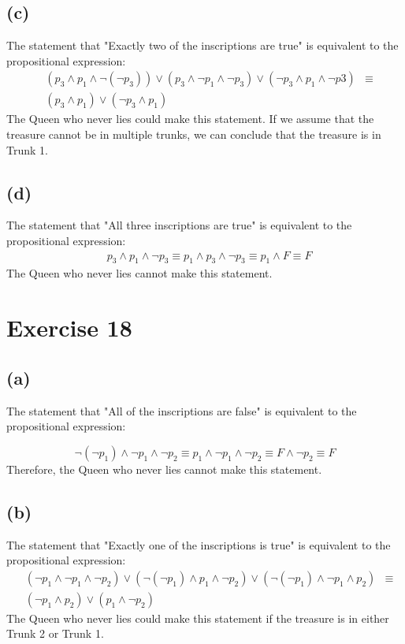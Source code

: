 \documentclass{article}
\begin{document}
\subsection{(c)}
The statement that "Exactly two of the inscriptions are true" is equivalent to the propositional expression:
\begin{align*}
	 & (p_3 \land p_1 \land \neg (\neg p_3)) \lor (p_3 \land \neg p_1 \land \neg p_3) \lor (\neg p_3 \land p_1 \land \neg p3) & \equiv \\
	 & (p_3 \land p_1) \lor (\neg p_3 \land p_1)
\end{align*}
The Queen who never lies could make this statement. If we assume that the treasure cannot be in multiple trunks, we can conclude that the treasure is in Trunk 1.

\subsection{(d)}
The statement that "All three inscriptions are true" is equivalent to the propositional expression:
\begin{align*}
	 & p_3 \land p_1 \land \neg p_3 \equiv p_1 \land p_3 \land \neg p_3 \equiv p_1 \land F \equiv F
\end{align*}
The Queen who never lies cannot make this statement.

\pagebreak

\section{Exercise 18}
\subsection{(a)}
The statement that "All of the inscriptions are false" is equivalent to the propositional expression:

\[
	\neg (\neg p_1) \land \neg p_1 \land \neg p_2 \equiv p_1 \land \neg p_1 \land \neg p_2 \equiv F \land \neg p_2 \equiv F
\]
Therefore, the Queen who never lies cannot make this statement.

\subsection{(b)}
The statement that "Exactly one of the inscriptions is true" is equivalent to the propositional expression:
\begin{align*}
	 & (\neg p_1 \land \neg p_1 \land \neg p_2) \lor (\neg (\neg p_1) \land p_1 \land \neg p_2) \lor (\neg (\neg p_1) \land \neg p_1 \land p_2) & \equiv \\
	 & (\neg p_1 \land p_2) \lor (p_1 \land \neg p_2)
\end{align*}
The Queen who never lies could make this statement if the treasure is in either Trunk 2 or Trunk 1.
\end{document}
